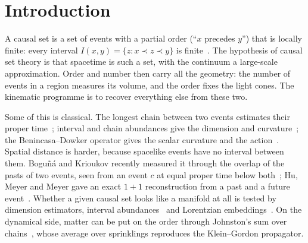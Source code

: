 \documentclass[11pt,a4paper]{article}
\begin{document}
\section{Introduction}
A causal set is a set of events with a partial order (``$x$ precedes $y$'') that is locally finite: every interval $I(x,y)=\{z:x\prec z\prec y\}$ is finite~\cite{BLMS87,Surya19}. The hypothesis of causal set theory is that spacetime is such a set, with the continuum a large-scale approximation. Order and number then carry all the geometry: the number of events in a region measures its volume, and the order fixes the light cones. The kinematic programme is to recover everything else from these two.

Some of this is classical. The longest chain between two events estimates their proper time~\cite{BrightwellGregory91}; interval and chain abundances give the dimension and curvature~\cite{RSS13,GlaserSurya13}; the Benincasa--Dowker operator gives the scalar curvature and the action~\cite{BD10,DowkerGlaser13}. Spatial distance is harder, because spacelike events have no interval between them. Bogu\~n\'a and Krioukov recently measured it through the overlap of the pasts of two events, seen from an event $c$ at equal proper time below both~\cite{BK24}; Hu, Meyer and Meyer gave an exact $1+1$ reconstruction from a past and a future event~\cite{HMM25}. Whether a given causal set looks like a manifold at all is tested by dimension estimators, interval abundances~\cite{GlaserSurya13} and Lorentzian embeddings~\cite{CloughEvans16,Henson06,Johnston25}. On the dynamical side, matter can be put on the order through Johnston's sum over chains~\cite{Johnston08,Johnston09}, whose average over sprinklings reproduces the Klein--Gordon propagator.
\end{document}

